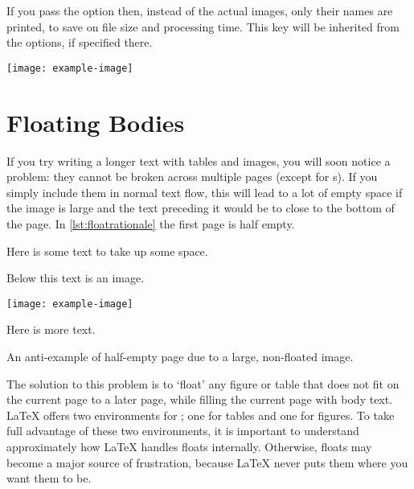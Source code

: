 If you pass the  option then, instead of the actual images, only
their names are printed, to save on file size and processing time. This key will
be inherited from the  options, if specified there.
\begin{example}
\texttt{[image: example-image]}
\end{example}

\section{Floating Bodies}
If you try writing a longer text with tables and images, you will soon notice a
problem: they cannot be broken across multiple pages (except for
s). If you simply include them in normal text flow, this will
lead to a lot of empty space if the image is large and the text preceding it
would be to close to the bottom of the page. In \autoref{lst:floatrationale}
the first page is half empty.
\begin{listing}
  \begin{lined}{11cm}
    \begin{example}[standalone, paperheight=4cm, to_page=2, vertical_pages]
\usepackage{graphicx} %
\usepackage{ragged2e} %
\geometry{includefoot} %
Here is some text
to take up some space.

Below this text is an image.

\begin{Center}
  \texttt{[image: example-image]}
\end{Center}

Here is more text.
\end{example}
  \end{lined}
  \caption{An anti-example of half-empty page due to a large, non-floated
    image.}\label{lst:floatrationale}
\end{listing}

The solution to this problem is to \enquote*{float} any figure or table that
does not fit on the current page to a later page, while filling the
current page with body text. \LaTeX{} offers two environments for
; one for tables and  one for figures.  To
take full advantage of these two environments, it is important to
understand approximately how \LaTeX{} handles floats internally.
Otherwise, floats may become a major source of frustration, because
\LaTeX{} never puts them where you want them to be.

